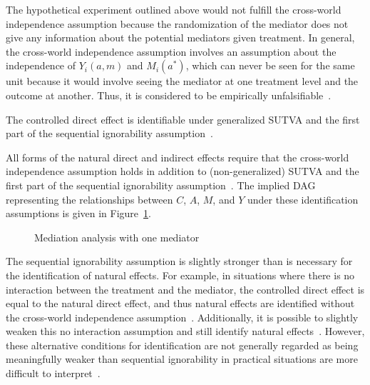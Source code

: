 The hypothetical experiment outlined above would not fulfill the cross-world independence assumption 
because the randomization of the mediator does not give any information about the potential mediators
given treatment. In general, the cross-world independence assumption involves an assumption about the 
independence of $Y_{i}(a,m)$ and $M_{i}(a^{*})$, which can never be seen for the same unit because it would involve
seeing the mediator at one treatment level and the outcome at another. Thus, it is considered to be empirically 
unfalsifiable~\citep{vanderweelevansteelandt2009, vanderweeleetal2014}. 

The controlled direct effect is identifiable under generalized SUTVA and the first part of the sequential
ignorability assumption~\citep{hernan2024}. 

All forms of the natural direct and indirect effects require 
that the cross-world independence assumption holds in addition to (non-generalized) SUTVA and the first part of the 
sequential ignorability assumption~\citep{pearl2001, imaietal2010a}. The implied DAG representing
the relationships between $C$, $A$, $M$, and $Y$ under these identification assumptions is given in 
Figure~\ref{fig:one_mediator_dag}. 


\begin{figure}[ht]
\centering
{}
\caption[]{Mediation analysis with one mediator}
\label{fig:one_mediator_dag}
\end{figure}

The sequential ignorability assumption is slightly stronger than is necessary for the identification of 
natural effects. For example, in situations where there is no interaction between the treatment and the mediator,
the controlled direct effect is equal to the natural direct effect, and thus natural effects are identified without
the cross-world independence assumption~\citep{robins2003}. Additionally, it is possible to slightly weaken this no
interaction assumption and still identify natural effects~\citep{petersenetal2006}. However, these alternative conditions
for identification are not generally regarded as being meaningfully weaker than sequential ignorability in practical 
situations are more difficult to interpret~\citep{petersenetal2006, imaietal2010a}. 

